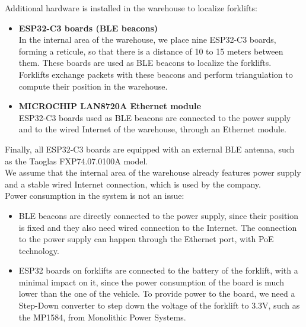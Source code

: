 Additional hardware is installed in the warehouse to localize forklifts:
\begin{itemize}
\item \textbf{ESP32-C3 boards (BLE beacons)}\\
In the internal area of the warehouse, we place nine ESP32-C3 boards, forming a reticule, so that there is a distance of 10 to 15 meters between them. These boards are used as BLE beacons to localize the forklifts. Forklifts exchange packets with these beacons and perform triangulation to compute their position in the warehouse.
\item \textbf{MICROCHIP LAN8720A Ethernet module}\\
ESP32-C3 boards used as BLE beacons are connected to the power supply and to the wired Internet of the warehouse, through an Ethernet module.
\end{itemize}
Finally, all ESP32-C3 boards are equipped with an external BLE antenna, such as the Taoglas FXP74.07.0100A model.\\
We assume that the internal area of the warehouse already features power supply and a stable wired Internet connection, which is used by the company.\\
Power consumption in the system is not an issue:
\begin{itemize}
\item BLE beacons are directly connected to the power supply, since their position is fixed and they also need wired connection to the Internet. The connection to the power supply can happen through the Ethernet port, with PoE technology.
\item ESP32 boards on forklifts are connected to the battery of the forklift, with a minimal impact on it, since the power consumption of the board is much lower than the one of the vehicle. To provide power to the board, we need a Step-Down converter to step down the voltage of the forklift to 3.3V, such as the MP1584, from Monolithic Power Systems.
\end{itemize}

